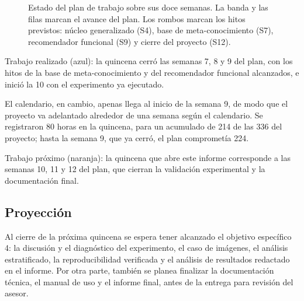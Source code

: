 \documentclass[11pt,letterpaper]{article}
\begin{document}
\begin{figure}[h]
\caption{Estado del plan de trabajo sobre sus doce semanas. La banda y las filas marcan el
avance del plan. Los rombos marcan los hitos previstos: núcleo generalizado (S4), base de meta-conocimiento (S7), recomendador
funcional (S9) y cierre del proyecto (S12).}
\label{fig:cronograma}
\end{figure}

Trabajo realizado (azul): la quincena cerró las semanas 7, 8 y 9 del plan, con los hitos
de la base de meta-conocimiento y del recomendador funcional alcanzados, e inició la 10
con el experimento ya ejecutado. 

El calendario, en cambio, apenas llega al inicio de la
semana 9, de modo que el proyecto va adelantado alrededor de una semana según el calendario. Se
registraron 80 horas en la quincena, para un acumulado de 214 de las 336 del proyecto;
hasta la semana 9, que ya cerró, el plan comprometía 224.

Trabajo próximo (naranja): la quincena que abre este informe corresponde a las semanas 10, 11 y 12 del plan, que cierran la validación experimental y la documentación final.

\subsection{Proyección}

Al cierre de la próxima quincena se espera tener alcanzado el objetivo específico 4: la
discusión y el diagnóstico del experimento, el caso de imágenes, el análisis estratificado,
la reproducibilidad verificada y el análisis de resultados redactado en el informe. Por otra parte, 
también se planea finalizar la documentación técnica, el manual de uso y el informe final, antes
de la entrega para revisión del asesor.
\end{document}
